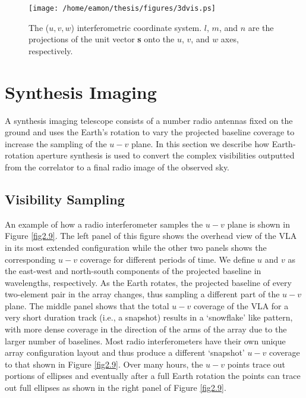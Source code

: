
\begin{figure}[hbt!]
\centering 
          \texttt{[image: /home/eamon/thesis/figures/3dvis.ps]}
\caption[The ($u,v,w$) interferometric coordinate system.]{The ($u,v,w$) interferometric coordinate system. $l$, $m$, and $n$ are the projections of the unit vector \textbf{s} onto the $u$, $v$, and $w$ axes, respectively.}
\label{fig2.8}
\end{figure}

\section{Synthesis Imaging}\label{sec:4}
A synthesis imaging telescope consists of a number radio antennas fixed on the ground and uses the Earth's rotation to vary the projected baseline coverage to increase the sampling of the $u-v$ plane. In this section we describe how Earth-rotation aperture synthesis is used to convert the complex visibilities outputted from the correlator to a final radio image of the observed sky.
\subsection{Visibility Sampling}\label{subsec:4.1}
An example of how a radio interferometer samples the $u-v$ plane is shown in Figure \ref{fig2.9}. The left panel of this figure shows the overhead view of the VLA in its most extended configuration while the other two panels shows the corresponding $u-v$ coverage for different periods of time. We define $u$ and $v$ as the east-west and north-south components of the projected baseline in wavelengths, respectively. As the Earth rotates, the projected baseline of every two-element pair in the array changes, thus sampling a different part of the $u-v$ plane. The middle panel shows that the total $u-v$ coverage of the VLA for a very short duration track (i.e., a snapshot) results in a `snowflake' like pattern, with more dense coverage in the direction of the arms of the array due to the larger number of baselines. Most radio interferometers have their own unique array configuration layout and thus produce a different `snapshot' $u-v$ coverage to that shown in Figure \ref{fig2.9}. Over many hours, the $u-v$ points trace out portions of ellipses and eventually after a full Earth rotation the points can trace out full ellipses as shown in the right panel of Figure \ref{fig2.9}. 

